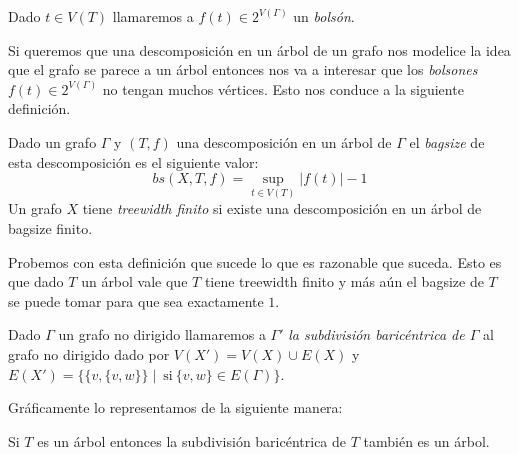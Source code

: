\documentclass[tesis.tex]{subfiles}
\begin{document}
Dado $t \in V(T)$ llamaremos a $f(t) \in 2^{V(\Gamma)}$ un \emph{bolsón}.

\begin{center}
\end{center}

\smallskip
Si queremos que una descomposición en un árbol de un grafo nos modelice la idea que el grafo se parece a un árbol entonces nos va a interesar que los \emph{bolsones} $f(t) \in 2^{V(\Gamma)}$ no tengan muchos vértices. 
Esto nos conduce a la siguiente definición.

\begin{deff}
	Dado un grafo $\Gamma$ y $(T,f)$ una descomposición en un árbol de $\Gamma$ el \emph{bagsize} de esta descomposición es el siguiente valor:
	\begin{equation*}
		bs(X,T,f) = \sup_{t \in V(T)} |f(t)| - 1
	\end{equation*}
	Un grafo $X$ tiene \emph{treewidth finito} si existe una descomposición en un árbol de bagsize finito.	
\end{deff}

Probemos con esta definición que sucede lo que es razonable que suceda.
Esto es que dado $T$ un árbol vale que $T$ tiene treewidth finito y más aún el bagsize de $T$ se puede tomar para que sea exactamente $1$.

\begin{deff}
	Dado $\Gamma$ un grafo no dirigido llamaremos a $\Gamma'$ \emph{la subdivisión baricéntrica de $\Gamma$ }al grafo no dirigido dado por
	$V(X') = V(X) \cup E(X)$ y $E(X') = \{ \{ v, \{v,w \} \} \mid \ \text{si} \ \{ v,w \} \in E(\Gamma) \}$.
\end{deff}

Gráficamente lo representamos de la siguiente manera:
\begin{center}
\end{center}

\begin{obs}\label{obs_sub_bari_arbol}
	Si $T$ es un árbol entonces la subdivisión baricéntrica de $T$ también es un árbol.
\end{obs}
\end{document}
